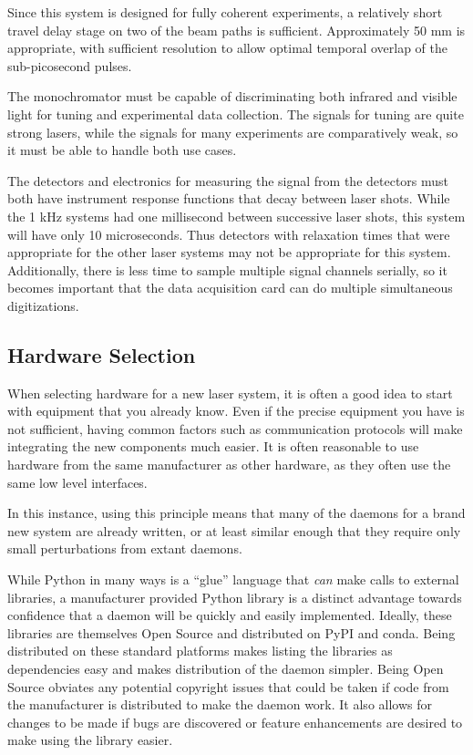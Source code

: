 Since this system is designed for fully coherent experiments, a relatively short travel delay stage on two of the beam paths is sufficient.
Approximately 50 mm is appropriate, with sufficient resolution to allow optimal temporal overlap of the sub-picosecond pulses.

The monochromator must be capable of discriminating both infrared and visible light for tuning and experimental data collection.
The signals for tuning are quite strong lasers, while the signals for many experiments are comparatively weak, so it must be able to handle both use cases.

The detectors and electronics for measuring the signal from the detectors must both have instrument response functions that decay between laser shots.
While the 1 kHz systems had one millisecond between successive laser shots, this system will have only 10 microseconds.
Thus detectors with relaxation times that were appropriate for the other laser systems may not be appropriate for this system.
Additionally, there is less time to sample multiple signal channels serially, so it becomes important that the data acquisition card can do multiple simultaneous digitizations.


\subsection{Hardware Selection}

When selecting hardware for a new laser system, it is often a good idea to start with equipment that you already know.
Even if the precise equipment you have is not sufficient, having common factors such as communication protocols will make integrating the new components much easier.
It is often reasonable to use hardware from the same manufacturer as other hardware, as they often use the same low level interfaces.

In this instance, using this principle means that many of the \yaq{} daemons for a brand new system are already written, or at least similar enough that they require only small perturbations from extant daemons.

While Python in many ways is a ``glue'' language that \textit{can} make calls to external libraries, a manufacturer provided Python library is a distinct advantage towards confidence that a \yaq{} daemon will be quickly and easily implemented.
Ideally, these libraries are themselves Open Source and distributed on PyPI\cite{PyPI} and conda\cite{conda}.
Being distributed on these standard platforms makes listing the libraries as dependencies easy and makes distribution of the \yaq{} daemon simpler.
Being Open Source obviates any potential copyright issues that could be taken if code from the manufacturer is distributed to make the \yaq{} daemon work.
It also allows for changes to be made if bugs are discovered or feature enhancements are desired to make using the library easier.

